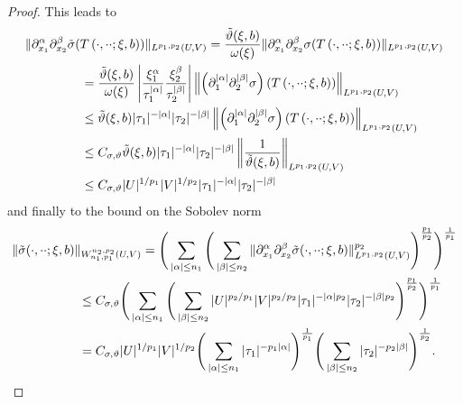 \documentclass[a4paper]{article}
\newcommand{\abs}[1]{| #1|}     %
\newcommand{\absbig}[1]{\left| #1\right|}     %
\newcommand{\norm}[2]{\|#1\|_{#2}}
\newcommand{\normbig}[2]{\left\|#1\right\|_{#2}}
\numberwithin{equation}{section}
\theoremstyle{remark}
\begin{document}
\begin{proof}
    This leads to
    \begin{align*}
        \norm
        {\partial_{x_1}^\alpha\partial_{x_2}^\beta\tilde{\sigma}(T\left(\cdot,\cdot\cdot;\xi,b\right))}{L^{p_1,p_2}(U, V)}
        \kern-10em&\kern10em=
        \frac{\tilde{\vartheta}(\xi,b)}{\omega(\xi)}
        \norm{\partial_{x_1}^\alpha\partial_{x_2}^\beta\sigma(T\left(\cdot,\cdot\cdot;\xi,b\right))}
        {L^{p_1,p_2}(U, V)}
        \\
        &=\frac{\tilde{\vartheta}(\xi,b)}{\omega(\xi)}
            \absbig{\frac{\xi_1^\alpha}{\tau_1^{\abs{\alpha}}}
                    \frac{\xi_2^\beta}{\tau_2^{\abs{\beta}}}}
            \normbig{\left(\partial_1^{\abs{\alpha}}\partial_2^{\abs{\beta}}\sigma\right)
                     (T\left(\cdot,\cdot\cdot;\xi,b\right))
                }{L^{p_1,p_2}(U, V)}\\
        &\leq\tilde{\vartheta}(\xi,b)
            \abs{\tau_1}^{-\abs{\alpha}}
                    \abs{\tau_2}^{-\abs{\beta}}
            \normbig{\left(\partial_1^{\abs{\alpha}}\partial_2^{\abs{\beta}}\sigma\right)
                     (T\left(\cdot,\cdot\cdot;\xi,b\right))
                }{L^{p_1,p_2}(U, V)}\\
        &\leq C_{\sigma,\vartheta}\tilde{\vartheta}(\xi,b)
            \abs{\tau_1}^{-\abs{\alpha}}
                    \abs{\tau_2}^{-\abs{\beta}}
            \normbig{\frac{1}{\tilde{\vartheta}(\xi,b)}
                }{L^{p_1,p_2}(U, V)}\\
        &\leq C_{\sigma,\vartheta}\abs{U}^{1/p_1}\abs{V}^{1/p_2}
            \abs{\tau_1}^{-\abs{\alpha}}
                    \abs{\tau_2}^{-\abs{\beta}}
    \end{align*}
    and finally to the bound on the Sobolev norm
    \begin{align*}
        \norm{\tilde{\sigma}(\cdot,\cdot\cdot;\xi,b)}{W_{n_1,p_1}^{n_2,p_2}(U, V)}
        \kern-5em&\kern5em=\Bigg(\sum_{\abs{\alpha}\leq n_1}
        \Bigg(\sum_{\abs{\beta}\leq n_2}
            \norm{\partial_{x_1}^\alpha
                \partial_{x_2}^\beta
                \tilde{\sigma}(\cdot,\cdot\cdot;\xi,b)
                }{L^{p_1,p_2}(U, V)}^{p_2}
        \Bigg)^{\frac{p_1}{p_2}}
        \Bigg)^{\frac{1}{p_1}}\\
        &\leq C_{\sigma,\vartheta}\Bigg(\sum_{\abs{\alpha}\leq n_1}
        \Bigg(\sum_{\abs{\beta}\leq n_2}
            \abs{U}^{p_2/p_1}\abs{V}^{p_2/p_2}
            \abs{\tau_1}^{-\abs{\alpha}p_2}
                    \abs{\tau_2}^{-\abs{\beta}p_2}
        \Bigg)^{\frac{p_1}{p_2}}
        \Bigg)^{\frac{1}{p_1}}\\
        &=C_{\sigma,\vartheta}\abs{U}^{1/p_1}\abs{V}^{1/p_2}
        \Bigg(\sum_{\abs{\alpha}\leq n_1}
            \abs{\tau_1}^{-p_1\abs{\alpha}}
        \Bigg)^{\frac{1}{p_1}}
        \Bigg(\sum_{\abs{\beta}\leq n_2}
            \abs{\tau_2}^{-p_2\abs{\beta}}
        \Bigg)^{\frac{1}{p_2}}.
    \end{align*}


\end{proof}
\end{document}

